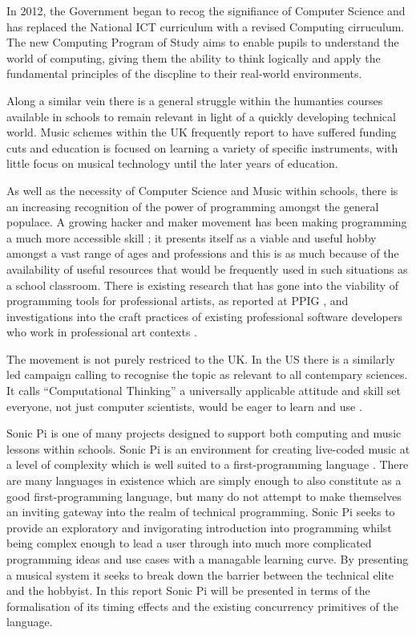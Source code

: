 \documentclass[11pt]{scrartcl}
\begin{document}
In 2012, the Government began to recog the signifiance of Computer Science and 
has replaced the National ICT curriculum with a revised Computing cirruculum. 
The new Computing Program of Study \cite{DfE13} aims to enable pupils to 
understand the world of computing, giving them the ability to think logically 
and apply the fundamental principles of the discpline to their real-world 
environments.

Along a similar vein there is a general struggle within the humanties courses 
available in schools to remain relevant in light of a quickly developing 
technical world. Music schemes within the UK frequently report to have 
suffered funding cuts and education is focused on learning a variety of 
specific instruments, with little focus on musical technology until the later 
years of education.

As well as the necessity of Computer Science and Music within schools, there 
is an increasing recognition of the power of programming amongst the general 
populace. A growing hacker and maker movement has been making programming a 
much more accessible skill \cite{BAD14}; it presents itself as a viable and 
useful hobby amongst a vast range of ages and professions and this is as much 
because of the availability of useful resources that would be frequently used 
in such situations as a school classroom. There is existing research that has 
gone into the viability of programming tools for professional artists, as 
reported at PPIG \cite{Ch12,BC05}, and investigations into the craft practices 
of existing professional software developers who work in professional art 
contexts \cite{W10}.

The movement is not purely restriced to the UK. In the US there is a similarly 
led campaign calling to recognise the topic as relevant to all contempary 
sciences. It calls ``Computational Thinking'' a universally applicable 
attitude and skill set everyone, not just computer scientists, would be eager 
to learn and use \cite{Wing06}.

Sonic Pi is one of many projects designed to support both computing and music 
lessons within schools. Sonic Pi is an environment for creating live-coded 
music at a level of complexity which is well suited to a first-programming 
language \cite{sp}. There are many languages in existence which are simply 
enough to also constitute as a good first-programming language, but many do 
not attempt to make themselves an inviting gateway into the realm of technical 
programming. Sonic Pi seeks to provide an exploratory and invigorating 
introduction into programming whilst being complex enough to lead a user 
through into much more complicated programming ideas and use cases with a 
managable learning curve. By presenting a musical system it seeks to break 
down the barrier between the technical elite and the hobbyist. In this report 
Sonic Pi will be presented in terms of the formalisation of its timing effects 
and the existing concurrency primitives of the language.
\end{document}
